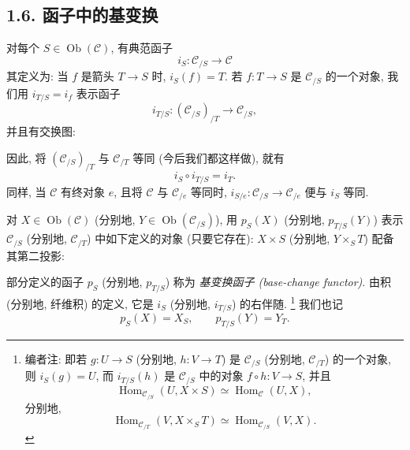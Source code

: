 
\subsection*{1.6. 函子中的基变换}

对每个 \(S\in\operatorname{Ob}(\mathscr C)\), 有典范函子
\[
  i_S:\mathscr C_{/S}\longrightarrow\mathscr C
\]
其定义为: 当 \(f\) 是箭头 \(T\to S\) 时, \(i_S(f)=T\). 若
\(f:T\to S\) 是 \(\mathscr C_{/S}\) 的一个对象, 我们用
\(i_{T/S}=i_f\) 表示函子
\[
  i_{T/S}:(\mathscr C_{/S})_{/T}\longrightarrow\mathscr C_{/S},
\]
并且有交换图:

\begin{center}
  
\end{center}

因此, 将 \((\mathscr C_{/S})_{/T}\) 与 \(\mathscr C_{/T}\) 等同
(今后我们都这样做), 就有
\[
  i_S\circ i_{T/S}=i_T.
\]
同样, 当 \(\mathscr C\) 有终对象 \(e\), 且将 \(\mathscr C\) 与
\(\mathscr C_{/e}\) 等同时, \(i_{S/e}:\mathscr C_{/S}\to\mathscr C_{/e}\)
便与 \(i_S\) 等同.

对 \(X\in\operatorname{Ob}(\mathscr C)\) (分别地,
\(Y\in\operatorname{Ob}(\mathscr C_{/S})\)), 用 \(p_S(X)\)
(分别地, \(p_{T/S}(Y)\)) 表示 \(\mathscr C_{/S}\) (分别地,
\(\mathscr C_{/T}\)) 中如下定义的对象 (只要它存在):
\(X\times S\) (分别地, \(Y\times_S T\)) 配备其第二投影:

\begin{center}
  
\end{center}

部分定义的函子 \(p_S\) (分别地, \(p_{T/S}\)) 称为
\emph{基变换函子 (base-change functor)}. 由积 (分别地, 纤维积) 的定义,
它是 \(i_S\) (分别地, \(i_{T/S}\)) 的右伴随.
\footnote{编者注: 即若 \(g:U\to S\) (分别地,
\(h:V\to T\)) 是 \(\mathscr C_{/S}\) (分别地,
\(\mathscr C_{/T}\)) 的一个对象, 则 \(i_S(g)=U\), 而 \(i_{T/S}(h)\)
是 \(\mathscr C_{/S}\) 中的对象 \(f\circ h:V\to S\), 并且
\[
  \operatorname{Hom}_{\mathscr C_{/S}}(U,X\times S)
    \simeq \operatorname{Hom}_{\mathscr C}(U,X),
\]
分别地,
\[
  \operatorname{Hom}_{\mathscr C_{/T}}(V,X\times_S T)
    \simeq \operatorname{Hom}_{\mathscr C_{/S}}(V,X).
\]}
我们也记
\[
  p_S(X)=X_S,
  \qquad
  p_{T/S}(Y)=Y_T.
\]

